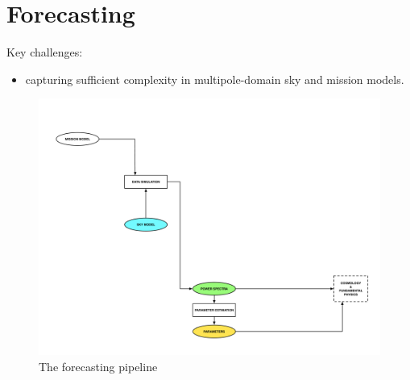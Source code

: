 
\section{Forecasting}

Key challenges: 
\begin{itemize}
\item capturing sufficient complexity in multipole-domain sky and mission models.
\end{itemize}

\begin{figure}[htbp]
\centering
\includegraphics[width=1\textwidth]{Analysis/fc}
\caption{The forecasting pipeline}
\label{default}

\end{figure}
